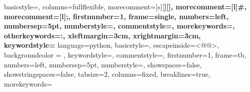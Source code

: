 		{
			basicstyle=\ttfamily\small,
			columns=fullflexible,
			morecomment=[s][\color{Orchid}\bfseries]{[}{]},
			morecomment=[l]{\#},
			morecomment=[l]{;},
			firstnumber=1,                	%
			frame=single,	                	%
			numbers=left,                   %
			numbersep=5pt,                  %
			numberstyle=\tiny\color{gray},	%
			commentstyle=\color{gray}\ttfamily,
			morekeywords={},
			otherkeywords={:},
			xleftmargin=3cm,
			xrightmargin=3cm,
			keywordstyle={\color{blue}\bfseries}
		}
	{
		language=python,
		basicstyle=\mdseries, %
		escapeinside={<@}{@>},
		backgroundcolor = \color{gray}, %
		keywordstyle=\color{vbablue},   %
		commentstyle=\color{gray}\ttfamily,  %
		firstnumber=1,                	%
		frame=tb,	                	%
		numbers=left,                   %
		numbersep=5pt,                  %
		numberstyle=\tiny\color{gray},	%
		showspaces=false,               %
		showstringspaces=false,         %
		tabsize=2,		                %
		columns=fixed,					%
		breaklines=true,				%
		morekeywords={}%
	}

